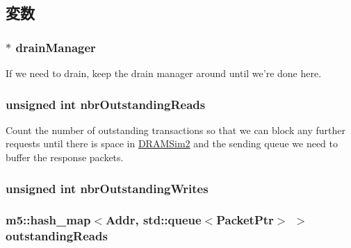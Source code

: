 \subsection{変数}
\hypertarget{classDRAMSim2_a329b71fb934a93312ca0aacbf5a3f982}{
\subsubsection[{drainManager}]{$\ast$ {\bf drainManager}}}
\label{classDRAMSim2_a329b71fb934a93312ca0aacbf5a3f982}
If we need to drain, keep the drain manager around until we're done here. \hypertarget{classDRAMSim2_a75a96fd06206c4a8580628497ad694df}{
\subsubsection[{nbrOutstandingReads}]{\setlength{\rightskip}{0pt plus 5cm}unsigned int {\bf nbrOutstandingReads}}}
\label{classDRAMSim2_a75a96fd06206c4a8580628497ad694df}
Count the number of outstanding transactions so that we can block any further requests until there is space in \hyperlink{classDRAMSim2}{DRAMSim2} and the sending queue we need to buffer the response packets. \hypertarget{classDRAMSim2_ae13aa3a1980dc05e181f85d7304baa82}{
\subsubsection[{nbrOutstandingWrites}]{\setlength{\rightskip}{0pt plus 5cm}unsigned int {\bf nbrOutstandingWrites}}}
\label{classDRAMSim2_ae13aa3a1980dc05e181f85d7304baa82}
\hypertarget{classDRAMSim2_aa436e51811d19fcd65fcc5061afc981a}{
\subsubsection[{outstandingReads}]{\setlength{\rightskip}{0pt plus 5cm}m5::hash\_\-map$<${\bf Addr}, std::queue$<${\bf PacketPtr}$>$ $>$ {\bf outstandingReads}}}
